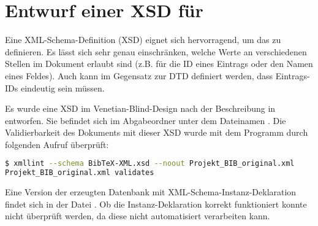 \section[Entwurf einer XSD]{Entwurf einer XSD für \BibTeXXML}

Eine XML-Schema-Definition (XSD) eignet sich hervorragend, um das
\BibTeXXMLformat{} zu definieren. Es lässt sich sehr genau einschränken, welche
Werte an verschiedenen Stellen im Dokument erlaubt sind (z.B. für die ID eines
Eintrags oder den Namen eines Feldes). Auch kann im Gegensatz zur DTD definiert
werden, dass Eintrags-IDs eindeutig sein müssen.

Es wurde eine XSD im Venetian-Blind-Design nach der Beschreibung in
\cite{oracle:xsd-design-patterns} entworfen. Sie befindet sich im Abgabeordner
unter dem Dateinamen . Die Validierbarkeit des Dokuments
mit dieser XSD wurde mit dem Programm  durch folgenden Aufruf
überprüft:
\begin{lstlisting}[language=bash]
$ xmllint --schema BibTeX-XML.xsd --noout Projekt_BIB_original.xml
Projekt_BIB_original.xml validates
\end{lstlisting}

Eine Version der erzeugten Datenbank mit XML-Schema-Instanz-Deklaration findet
sich in der Datei . Ob die
Instanz-Deklaration korrekt funktioniert konnte nicht überprüft werden, da
 diese nicht automatisiert verarbeiten kann.